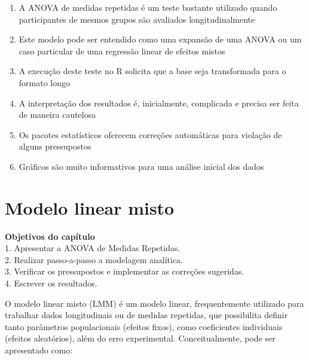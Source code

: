 \documentclass[
]{book}
\providecommand{\tightlist}{%
  \setlength{\itemsep}{0pt}\setlength{\parskip}{0pt}}
\begin{document}
\begin{explore}

\begin{enumerate}
\def\labelenumi{\arabic{enumi}.}
\tightlist
\item
  A ANOVA de medidas repetidas é um teste bastante utilizado quando
  participantes de mesmos grupos são avaliados longitudinalmente\\
\item
  Este modelo pode ser entendido como uma expansão de uma ANOVA ou um
  caso particular de uma regressão linear de efeitos mistos\\
\item
  A execução deste teste no R solicita que a base seja transformada para
  o formato longo\\
\item
  A interpretação dos resultados é, inicialmente, complicada e precisa
  ser feita de maneira cautelosa\\
\item
  Os pacotes estatísticos oferecem correções automáticas para violação
  de alguns pressupostos\\
\item
  Gráficos são muito informativos para uma análise inicial dos dados\\
\end{enumerate}

\end{explore}

\hypertarget{modelo-linear-misto}{%
\chapter{Modelo linear misto}\label{modelo-linear-misto}}

\begin{objectives}
\textbf{Objetivos do capítulo}\\
1. Apresentar a ANOVA de Medidas Repetidas.\\
2. Realizar passo-a-passo a modelagem analítica.\\
3. Verificar os pressupostos e implementar as correções sugeridas.\\
4. Escrever os resultados.
\end{objectives}

O modelo linear misto (LMM) é um modelo linear, frequentemente utilizado
para trabalhar dados longitudinais ou de medidas repetidas, que
possibilita definir tanto parâmetros populacionais (efeitos fixos), como
coeficientes individuais (efeitos aleatórios), além do erro
experimental. Conceitualmente, pode ser apresentado como:
\end{document}
